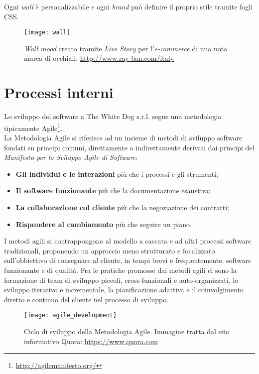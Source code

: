 Ogni \textit{wall} è personalizzabile e ogni \textit{brand} può definire il proprio stile tramite fogli CSS.

\label{Wall}
\begin{figure}[ht]
	\begin{center}
		\texttt{[image: wall]}
		\caption{\textit{Wall mood} creato tramite \textit{Live Story} per l'\textit{e-commerce} di una nota marca di occhiali: \url{http://www.ray-ban.com/italy}}
	\end{center}
\end{figure}
\FloatBarrier

\section{Processi interni}

Lo sviluppo del software a The White Dog s.r.l. segue una metodologia tipicamente Agile\footnote[5]{\url{http://agilemanifesto.org/}}. \\ 
La Metodologia Agile si riferisce ad un insieme di metodi di sviluppo software fondati su principi comuni, direttamente o indirettamente derivati dai principi del \textit{Manifesto per lo Sviluppo Agile di Software}: 

\begin{itemize}
	\item \textbf{Gli individui e le interazioni} più che i processi e gli strumenti;
	\item \textbf{Il software funzionante} più che la documentazione esaustiva;
	\item \textbf{La collaborazione col cliente} più che la negoziazione dei contratti;
	\item \textbf{Rispondere al cambiamento} più che seguire un piano.
\end{itemize}

I metodi agili si contrappongono al modello a cascata e ad altri processi software tradizionali, proponendo un approccio meno strutturato e focalizzato sull'obbiettivo di consegnare al cliente, in tempi brevi e frequentemente, software funzionante e di qualità. Fra le pratiche promosse dai metodi agili ci sono la formazione di team di sviluppo piccoli, cross-funzionali e auto-organizzati, lo sviluppo iterativo e incrementale, la pianificazione adattiva e il coinvolgimento diretto e continuo del cliente nel processo di sviluppo. 

\label{Metodologia Agile}
\begin{figure}[ht]
	\begin{center}
		\texttt{[image: agile\_development]}
		\caption{Ciclo di sviluppo della Metodologia Agile. Immagine tratta dal sito informativo Quora: \url{https://www.quora.com}}
	\end{center}
\end{figure}
\FloatBarrier

